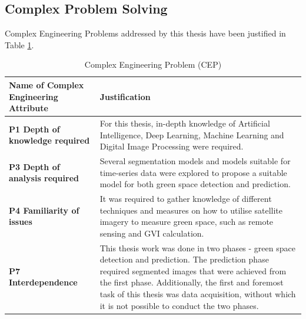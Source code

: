  \subsection{Complex Problem Solving}
 Complex Engineering Problems addressed by this thesis have been justified in Table \ref{table_OBE1}. %
\begin{table}[!h]
    \centering
    \caption{Complex Engineering Problem (CEP)}
    \begin{tabular}{p{.27\linewidth} p{.67\linewidth}}
        \hline
        Name of Complex \newline Engineering Attribute & Justification \\ \hline
                  \textbf{P1 \newline   Depth of knowledge required}   &  For this thesis, in-depth knowledge of Artificial Intelligence, Deep Learning, Machine Learning and Digital Image Processing were required. \\ [0.75em]
                  \textbf{P3 \newline   Depth of analysis \newline required } & Several segmentation models and models suitable for time-series data were explored to propose a suitable model for both green space detection and prediction.  \\ [0.75em]
                  \textbf{P4 \newline  Familiarity of \newline issues } & It was required to gather knowledge of different techniques and measures on how to utilise satellite imagery to measure green space, such as remote sensing and GVI calculation.  \\ [0.75em]
\textbf{P7 \newline   Interdependence} & This thesis work was done in two phases - green space detection and prediction. The prediction phase required segmented images that were achieved from the first phase. Additionally, the first and foremost task of this thesis was data acquisition, without which it is not possible to conduct the two phases.\\
        \hline
    \end{tabular}
    \label{table_OBE1}
\end{table}

